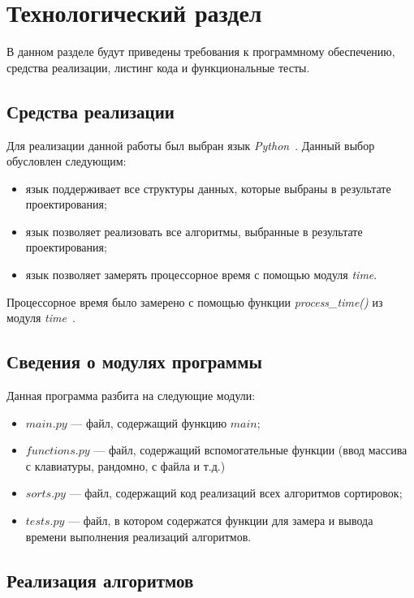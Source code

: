 \chapter{Технологический раздел}

В данном разделе будут приведены требования к программному обеспечению, средства реализации, листинг кода и функциональные тесты.


\section{Средства реализации}

Для реализации данной работы был выбран язык \textit{Python}~\cite{python}.
Данный выбор обусловлен следующим:
\begin{itemize}
	\item язык поддерживает все структуры данных, которые выбраны в результате проектирования;
	\item язык позволяет реализовать все алгоритмы, выбранные в результате проектирования;
	\item язык позволяет замерять процессорное время с помощью модуля \textit{time}. 
\end{itemize}

Процессорное время было замерено с помощью функции \textit{process\_time()} из модуля \textit{time}~\cite{python-time}.

\section{Сведения о модулях программы}

Данная программа разбита на следующие модули:
\begin{itemize}
	\item $main.py$ --- файл, содержащий функцию $main$;
	\item $functions.py$ --- файл, содержащий вспомогательные функции (ввод массива с клавиатуры, рандомно, с файла и т.д.)
	\item $sorts.py$ --- файл, содержащий код реализаций всех алгоритмов сортировок;
	\item $tests.py$ --- файл, в котором содержатся функции для замера и вывода времени выполнения реализаций алгоритмов.
\end{itemize}

\section{Реализация алгоритмов}

